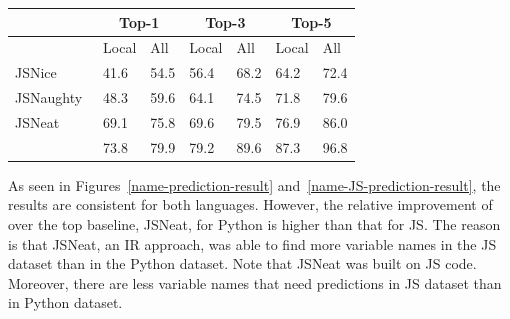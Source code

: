 {{\begin{table}[t]
\begin{center}
\begin{tabular}{|p{1.9cm}<{\centering}|p{0.65cm}<{\centering}|p{0.65cm}<{\centering}|p{0.65cm}<{\centering}|p{0.65cm}<{\centering}|p{0.65cm}<{\centering}|p{0.65cm}<{\centering}|}
			\hline
                       & \multicolumn{2}{c|}{Top-1}         & \multicolumn{2}{c|}{Top-3}         & \multicolumn{2}{c|}{Top-5} \\
			\hline
                       & Local & All & Local & All & Local & All  \\ 
			\hline
		        JSNice~\cite{JSNice2015} &  41.6    & 54.5  & 56.4 &    68.2   & 64.2      &   72.4    \\
			JSNaughty~\cite{JSNaughty2017}  &   48.3   &  59.6    &  64.1    &  74.5    &  71.8    &   79.6    \\
			JSNeat~\cite{icse19}  &   69.1   &  75.8    &  69.6    & 79.5     &  76.9    & 86.0     \\
			\hline
			{\bf {\tool}} & 73.8 & 79.9 & 79.2 & 89.6 & 87.3 & 96.8 \\
			\hline
		\end{tabular}
		\label{name-JS-result}
	\end{center}
\end{table}


As seen in Figures~\ref{name-prediction-result}
and~\ref{name-JS-prediction-result}, the results are consistent for
both languages. However, the relative improvement of {\tool} over the
top baseline, JSNeat, for Python is higher than that for JS. The
reason is that JSNeat, an IR approach, was able to find more variable
names in the JS dataset than in the Python dataset.  Note that JSNeat
was built on JS code. Moreover, there are less variable names that
need predictions in JS dataset than in Python dataset.


}}
